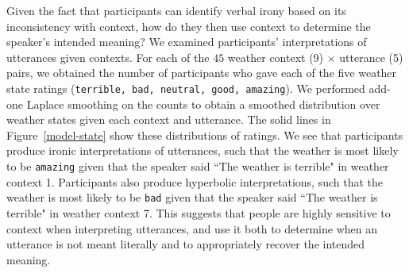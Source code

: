 \documentclass[10pt,letterpaper]{article}
\begin{document}

Given the fact that participants can identify verbal irony based on its inconsistency with context, how do they then use context to determine the speaker's intended meaning? We examined participants' interpretations of utterances given contexts. For each of the $45$ weather context (9) $\times$ utterance (5) pairs, we obtained the number of participants who gave each of the five weather state ratings (\texttt{terrible, bad, neutral, good, amazing}). We performed add-one Laplace smoothing on the counts to obtain a smoothed distribution over weather states given each context and utterance. The solid lines in Figure~\ref{model-state} show these distributions of ratings. We see that participants produce ironic interpretations of utterances, such that the weather is most likely to be \texttt{amazing} given that the speaker said ``The weather is terrible" in weather context 1. Participants also produce hyperbolic interpretations, such that the weather is most likely to be \texttt{bad} given that the speaker said ``The weather is terrible" in weather context 7. This suggests that people are highly sensitive to context when interpreting utterances, and use it both to determine when an utterance is not meant literally and to appropriately recover the intended meaning. 
\end{document}
